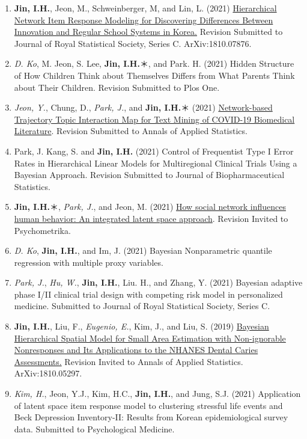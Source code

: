 \documentclass[
]{book}
\begin{document}
\begin{enumerate}
\def\labelenumi{\arabic{enumi}.}
\item
  \textbf{Jin, I.H.}, Jeon, M., Schweinberger, M, and Lin, L. (2021) \href{https://arxiv.org/abs/1810.07876}{Hierarchical Network Item Response Modeling for Discovering Differences Between Innovation and Regular School Systems in Korea.} Revision Submitted to Journal of Royal Statistical Society, Series C. ArXiv:1810.07876.
\item
  \emph{D. Ko}, M. Jeon, S. Lee, \textbf{Jin, I.H.}＊, and Park. H. (2021) Hidden Structure of How Children Think about Themselves Differs from What Parents Think about Their Children. Revision Submitted to Plos One.
\item
  \emph{Jeon, Y.}, Chung, D., \emph{Park, J.}, and \textbf{Jin, I.H.}＊ (2021) \href{https://arxiv.org/abs/2106.07374}{Network-based Trajectory Topic Interaction Map for Text Mining of COVID-19 Biomedical Literature}. Revision Submitted to Annals of Applied Statistics.
\item
  Park, J. Kang, S. and \textbf{Jin, I.H.} (2021) Control of Frequentist Type I Error Rates in Hierarchical Linear Models for Multiregional Clinical Trials Using a Bayesian Approach. Revision Submitted to Journal of Biopharmaceutical Statistics.
\item
  \textbf{Jin, I.H.}＊, \emph{Park, J.}, and Jeon, M. (2021) \href{https://arxiv.org/abs/2109.05200}{How social network influences human behavior: An integrated latent space approach}. Revision Invited to Psychometrika.
\item
  \emph{D. Ko}, \textbf{Jin, I.H.}, and Im, J. (2021) Bayesian Nonparametric quantile regression with multiple proxy variables.
\item
  \emph{Park, J.}, \emph{Hu, W.}, \textbf{Jin, I.H.}, Liu. H., and Zhang, Y. (2021) Bayesian adaptive phase I/II clinical trial design with competing risk model in personalized medicine. Submitted to Journal of Royal Statistical Society, Series C.
\item
  \textbf{Jin, I.H.}, Liu, F., \emph{Eugenio, E.}, Kim, J., and Liu, S. (2019) \href{https://arxiv.org/abs/1810.05297}{Bayesian Hierarchical Spatial Model for Small Area Estimation with Non-ignorable Nonresponses and Its Applications to the NHANES Dental Caries Assessments.} Revision Invited to Annals of Applied Statistics. ArXiv:1810.05297.
\item
  \emph{Kim, H.}, Jeon, Y.J., Kim, H.C., \textbf{Jin, I.H.}, and Jung, S.J. (2021) Application of latent space item response model to clustering stressful life events and Beck Depression Inventory-II: Results from Korean epidemiological survey data. Submitted to Psychological Medicine.
\end{enumerate}
\end{document}
